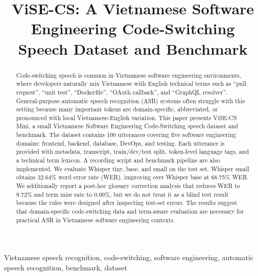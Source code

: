\documentclass[conference]{IEEEtran}
\begin{document}
\title{ViSE-CS: A Vietnamese Software Engineering Code-Switching Speech Dataset and Benchmark}

\author{
}

\maketitle

\begin{abstract}
Code-switching speech is common in Vietnamese software engineering environments, where developers naturally mix Vietnamese with English technical terms such as ``pull request'', ``unit test'', ``Dockerfile'', ``OAuth callback'', and ``GraphQL resolver''. General-purpose automatic speech recognition (ASR) systems often struggle with this setting because many important tokens are domain-specific, abbreviated, or pronounced with local Vietnamese-English variation. This paper presents ViSE-CS Mini, a small Vietnamese Software Engineering Code-Switching speech dataset and benchmark. The dataset contains 100 utterances covering five software engineering domains: frontend, backend, database, DevOps, and testing. Each utterance is provided with metadata, transcript, train/dev/test split, token-level language tags, and a technical term lexicon. A recording script and benchmark pipeline are also implemented. We evaluate Whisper tiny, base, and small on the test set. Whisper small obtains 32.64\% word error rate (WER), improving over Whisper base at 68.75\% WER. We additionally report a post-hoc glossary correction analysis that reduces WER to 9.72\% and term miss rate to 0.00\%, but we do not treat it as a blind test result because the rules were designed after inspecting test-set errors. The results suggest that domain-specific code-switching data and term-aware evaluation are necessary for practical ASR in Vietnamese software engineering contexts.
\end{abstract}

\begin{IEEEkeywords}
Vietnamese speech recognition, code-switching, software engineering, automatic speech recognition, benchmark, dataset
\end{IEEEkeywords}
\end{document}
